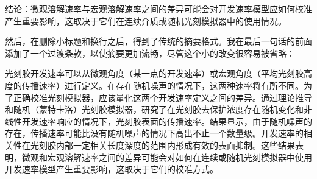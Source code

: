 结论：微观溶解速率与宏观溶解速率之间的差异可能会对开发速率模型应如何校准产生重要影响，这取决于它们在连续介质或随机光刻模拟器中的使用情况。

然后，在删除小标题和换行之后，得到了传统的摘要格式。我在最后一句话的前面添加了一个过渡条款，以使摘要更加流畅，尽管这个小的改变很容易被省略：

光刻胶开发速率可以从微观角度（某一点的开发速率）或宏观角度（平均光刻胶高度的传播速率）进行定义。在存在随机噪声的情况下，这两种速率将有所不同。为了正确校准光刻模拟器，应该量化这两个开发速率定义之间的差异。通过理论推导和随机（蒙特卡洛）光刻胶模拟器，研究了在光刻胶去保护浓度存在随机变化和非线性开发速率响应的情况下，光刻胶表面的传播速率。结果显示，由于随机噪声的存在，传播速率可能比没有随机噪声的情况下高出不止一个数量级。开发速率的相关性在光刻胶内部一定相关长度深度的范围内形成有效的表面抑制。这些结果表明，微观和宏观溶解速率之间的差异可能会对如何在连续或随机光刻模拟器中使用开发速率模型产生重要影响，这取决于它们的校准方式。

